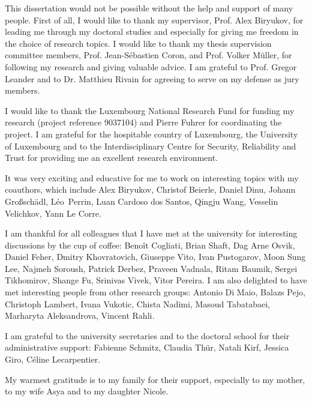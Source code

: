 \begin{acknowledgements}
\addchaptertocentry{\acknowledgementname}

This dissertation would not be possible without the help and support of many people. First of all, I would like to thank my supervisor, Prof. Alex Biryukov, for leading me through my doctoral studies and especially for giving me freedom in the choice of research topics. I would like to thank my thesis supervision committee members, Prof. Jean-Sébastien Coron, and Prof. Volker Müller, for following my research and giving valuable advice. I am grateful to Prof. Gregor Leander and to Dr. Matthieu Rivain for agreeing to serve on my defense as jury members.

I would like to thank the Luxembourg National Research Fund for funding my research (project reference 9037104) and Pierre Fuhrer for coordinating the project. I am grateful for the hospitable country of Luxembourg, the University of Luxembourg and to the Interdisciplinary Centre for Security, Reliability and Trust for providing me an excellent research environment.

It was very exciting and educative for me to work on interesting topics with my coauthors, which include 
Alex Biryukov,
Christof Beierle,
Daniel Dinu,
Johann Gro{\ss}sch{\"a}dl,
L\'eo~Perrin,
Luan Cardoso dos Santos,
Qingju Wang,
Vesselin Velichkov,
Yann Le Corre.

I am thankful for all colleagues that I have met at the university for interesting  discussions by the cup of coffee:
Benoît Cogliati,
Brian Shaft,
Dag Arne Osvik,
Daniel Feher,
Dmitry Khovratovich,
Giuseppe Vito,
Ivan Pustogarov,
Moon Sung Lee,
Najmeh Soroush,
Patrick Derbez,
Praveen Vadnala,
Ritam Baumik,
Sergei Tikhomirov,
Shange Fu,
Srinivas Vivek,
Vitor Pereira.
I am also delighted to have met interesting people from other research groups:
Antonio Di Maio, Balazs Pejo, Christoph Lambert, Ivana Vukotic, Chista Nadimi, Masoud Tabatabaei, Marharyta Aleksandrova, Vincent Rahli.

I am grateful to the university secretaries and to the doctoral school for their administrative support: Fabienne Schmitz, Claudia Thür, Natali Kirf, Jessica Giro, Céline Lecarpentier.

My warmest gratitude is to my family for their support, especially to my mother, to my wife Asya and to my daughter Nicole.


\end{acknowledgements}
